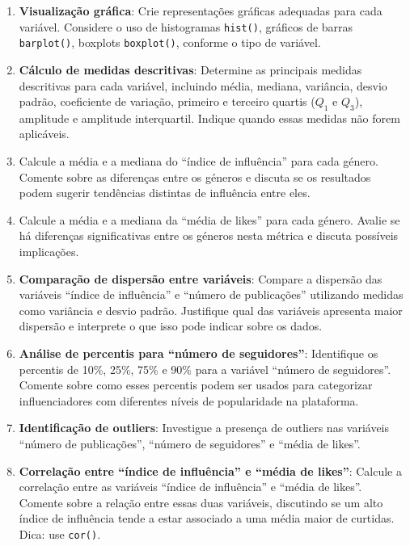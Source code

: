 \documentclass[
]{book}
\newenvironment{Shaded}{\begin{snugshade}}{\end{snugshade}}
\newcommand{\CommentTok}[1]{\textcolor[rgb]{0.56,0.35,0.01}{\textit{#1}}}
\newcommand{\FunctionTok}[1]{\textcolor[rgb]{0.13,0.29,0.53}{\textbf{#1}}}
\newcommand{\NormalTok}[1]{#1}
\newcommand{\OtherTok}[1]{\textcolor[rgb]{0.56,0.35,0.01}{#1}}
\newcommand{\SpecialCharTok}[1]{\textcolor[rgb]{0.81,0.36,0.00}{\textbf{#1}}}
\begin{document}
\begin{Shaded}
\end{Shaded}

\begin{enumerate}
\def\labelenumi{(\alph{enumi})}
\setcounter{enumi}{2}
\item
  \textbf{Visualização gráfica}: Crie representações gráficas adequadas para cada variável. Considere o uso de histogramas \texttt{hist()}, gráficos de barras \texttt{barplot()}, boxplots \texttt{boxplot()}, conforme o tipo de variável.
\item
  \textbf{Cálculo de medidas descritivas}: Determine as principais medidas descritivas para cada variável, incluindo média, mediana, variância, desvio padrão, coeficiente de variação, primeiro e terceiro quartis (\(Q_1\) e \(Q_3\)), amplitude e amplitude interquartil. Indique quando essas medidas não forem aplicáveis.
\item
  Calcule a média e a mediana do ``índice de influência'' para cada género. Comente sobre as diferenças entre os géneros e discuta se os resultados podem sugerir tendências distintas de influência entre eles.
\item
  Calcule a média e a mediana da ``média de likes'' para cada género. Avalie se há diferenças significativas entre os géneros nesta métrica e discuta possíveis implicações.
\item
  \textbf{Comparação de dispersão entre variáveis}: Compare a dispersão das variáveis ``índice de influência'' e ``número de publicações'' utilizando medidas como variância e desvio padrão. Justifique qual das variáveis apresenta maior dispersão e interprete o que isso pode indicar sobre os dados.
\item
  \textbf{Análise de percentis para ``número de seguidores''}: Identifique os percentis de 10\%, 25\%, 75\% e 90\% para a variável ``número de seguidores''. Comente sobre como esses percentis podem ser usados para categorizar influenciadores com diferentes níveis de popularidade na plataforma.
\item
  \textbf{Identificação de outliers}: Investigue a presença de outliers nas variáveis ``número de publicações'', ``número de seguidores'' e ``média de likes''.
\item
  \textbf{Correlação entre ``índice de influência'' e ``média de likes''}: Calcule a correlação entre as variáveis ``índice de influência'' e ``média de likes''. Comente sobre a relação entre essas duas variáveis, discutindo se um alto índice de influência tende a estar associado a uma média maior de curtidas. Dica: use \texttt{cor()}.
\end{enumerate}
\end{document}
